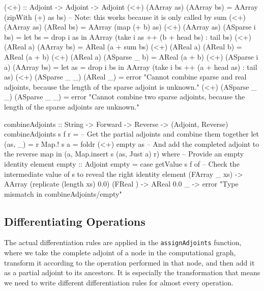         \begin{haskell}[caption=Adjoint combination operator and adjoint summation function, label=lst:combine, gobble=12]
            (<+) :: Adjoint -> Adjoint -> Adjoint
            (<+) (AArray as)   (AArray    bs) = AArray (zipWith (+) as bs)
            -- Note: this works because it is only called by sum
            (<+) (AArray as)   (AReal     bs) = AArray (map (+ b) as)
            (<+) (AArray as)   (ASparse i bs) =
                let bs = drop i as
                in  AArray (take i as ++ (b + head bs) : tail bs)
            (<+) (AReal  a)    (AArray    bs) = AReal (a + sum bs)
            (<+) (AReal  a)    (AReal     b)  = AReal (a + b)
            (<+) (AReal  a)    (ASparse _ b)  = AReal (a + b)
            (<+) (ASparse i a) (AArray    bs) = 
                let as = drop i bs
                in  AArray (take i bs ++ (a + head as) : tail as)
            (<+) (ASparse _ _) (AReal     _)  = error "Cannot combine sparse and real
                adjoints, because the length of the sparse adjoint is unknown."
            (<+) (ASparse _ _) (ASparse _ _)  = error "Cannot combine two sparse adjoints,
                because the length of the sparse adjoints are unknown."

            combineAdjoints :: String -> Forward -> Reverse -> (Adjoint, Reverse)
            combineAdjoints s f r =
                -- Get the partial adjoints and combine them together
                let (as, _) = r Map.! s
                    a       = foldr (<+) empty as
                -- And add the completed adjoint to the reverse map
                in  (a, Map.insert s (as, Just a) r)
                where
                    -- Provide an empty identity element
                    empty :: Adjoint
                    empty = case getValue s f of
                        -- Check the intermediate value of s to reveal the right identity element
                        (FArray _ xs) -> AArray (replicate (length xs) 0.0)
                        (FReal  {})   -> AReal  0.0
                        _             -> error "Type mismatch in combineAdjoints/empty"
        \end{haskell}

    \clearpage
    \subsection{Differentiating Operations}
        The actual differentiation rules are applied in the \texttt{assignAdjoints} function, where we take the complete adjoint of a node in the computational graph, transform it according to the operation performed in that node, and then add it as a partial adjoint to its ancestors.
        It is especially the transformation that means we need to write different differentiation rules for almost every operation.


